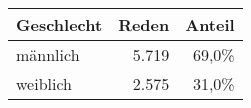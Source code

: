 
\begin{tabular}{lrr}
\toprule
Geschlecht & Reden & Anteil\\
\midrule
männlich & 5.719 & 69,0\%\\
weiblich & 2.575 & 31,0\%\\
\bottomrule
\end{tabular}